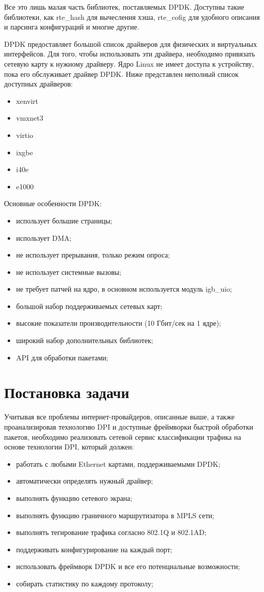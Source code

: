 Все это лишь малая часть библиотек, поставляемых DPDK. Доступны такие библиотеки, как rte\_hash для вычесления хэша, rte\_cofig для удобного описания и парсинга конфигураций и многие другие.

DPDK предоставляет большой список драйверов для физических и виртуальных интерфейсов. Для того, чтобы использовать эти драйвера, необходимо привязать сетевую карту к нужному драйверу. Ядро Linux не имеет доступа к устройству, пока его обслуживает драйвер DPDK. Ниже представлен неполный список доступных драйверов:
\begin{itemize}
\item xenvirt
\item vmxnet3
\item virtio
\item ixgbe
\item i40e
\item e1000
\end{itemize}

Основные особенности DPDK:
\begin{itemize}
\item использует большие страницы;
\item использует DMA;
\item не использует прерывания, только режим опроса;
\item не использует системные вызовы;
\item не требует патчей на ядро, в основном используется модуль igb\_uio;
\item большой набор поддерживаемых сетевых карт;
\item высокие показатели производительности (10 Гбит/сек на 1 ядре);
\item широкий набор дополнительных библиотек;
\item API для обработки пакетами;
\end{itemize}

\section{Постановка задачи}
Учитывая все проблемы интернет-провайдеров, описанные выше, а также проанализировав технологию DPI и доступные фреймворки быстрой обработки пакетов, необходимо реализовать сетевой сервис классификации трафика на основе технологии DPI, который должен:
\begin{itemize}
\item работать с любыми Ethernet картами, поддерживаемыми DPDK;
\item автоматически определять нужный драйвер;
\item выполнять функцию сетевого экрана;
\item выполнять функцию граничного маршрутизатора в MPLS сети;
\item выполнять тегирование трафика согласно 802.1Q и 802.1AD;
\item поддерживать конфигурирование на каждый порт;
\item использовать фреймворк DPDK и все его потенциальные возможности;
\item собирать статистику по каждому протоколу;
\end{itemize}

